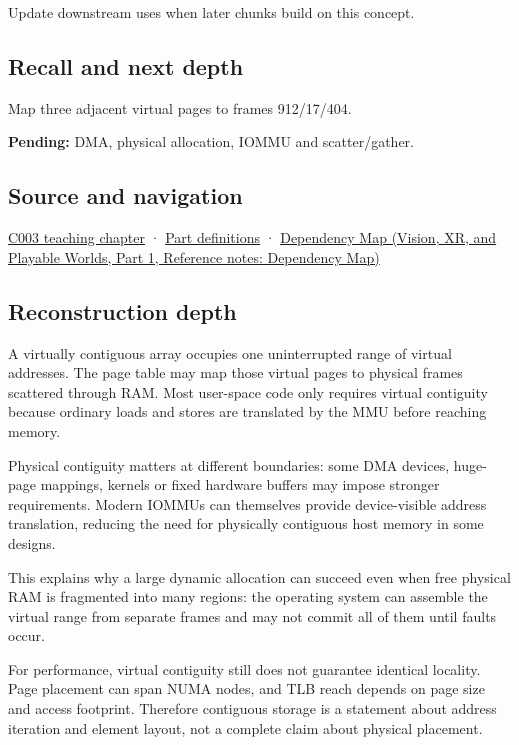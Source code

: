 Update downstream uses when later chunks build on this concept.

\subsection{Recall and next depth}\label{appendix-f897c1ddac8f-recall-and-next-depth}

\hypertarget{appendix-f897c1ddac8f-recall-and-next-depth}{}

Map three adjacent virtual pages to frames 912/17/404.

\textbf{Pending:} DMA, physical allocation, IOMMU and scatter/gather.

\subsection{Source and navigation}\label{appendix-f897c1ddac8f-source-and-navigation}

\hypertarget{appendix-f897c1ddac8f-source-and-navigation}{}

\hyperref[01-foundations-i-ch002-where-the-bytes-live]{C003 teaching chapter} · \hyperref[appendix-fd090d982a15-m003---parts-41-60]{Part definitions} · \href{../07-Vision-XR-and-Playable-Worlds-P01/main.pdf\#nameddest=appendix-4ad47bdd269a}{Dependency Map (Vision, XR, and Playable Worlds, Part 1, Reference notes: Dependency Map)}

\subsection{Reconstruction depth}\label{appendix-f897c1ddac8f-reconstruction-depth}

\hypertarget{appendix-f897c1ddac8f-reconstruction-depth}{}

A virtually contiguous array occupies one uninterrupted range of virtual addresses. The page table may map those virtual pages to physical frames scattered through RAM. Most user-space code only requires virtual contiguity because ordinary loads and stores are translated by the MMU before reaching memory.

Physical contiguity matters at different boundaries: some DMA devices, huge-page mappings, kernels or fixed hardware buffers may impose stronger requirements. Modern IOMMUs can themselves provide device-visible address translation, reducing the need for physically contiguous host memory in some designs.

This explains why a large dynamic allocation can succeed even when free physical RAM is fragmented into many regions: the operating system can assemble the virtual range from separate frames and may not commit all of them until faults occur.

For performance, virtual contiguity still does not guarantee identical locality. Page placement can span NUMA nodes, and TLB reach depends on page size and access footprint. Therefore contiguous storage is a statement about address iteration and element layout, not a complete claim about physical placement.
